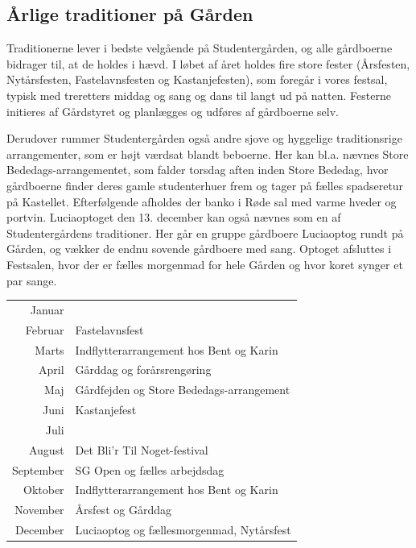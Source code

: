 \documentclass[11pt,article,twoside,openany,danish,extrafontsizes]{memoir} %
\begin{document}
\subsection{Årlige traditioner på Gården}
Traditionerne lever i bedste velgående på Studentergården, og alle gårdboerne bidrager til, at de holdes i hævd. I løbet af året holdes fire store fester (Årsfesten, Nytårsfesten, Fastelavnsfesten og Kastanjefesten), som foregår i vores festsal, typisk med treretters middag og sang og dans til langt ud på natten. Festerne initieres af Gårdstyret og planlægges og udføres af gårdboerne selv.

Derudover rummer Studentergården også andre sjove og hyggelige traditionsrige arrangementer, som er højt værdsat blandt beboerne. Her kan bl.a. nævnes Store Bededags-arrangementet, som falder torsdag aften inden Store Bededag, hvor gårdboerne finder deres gamle studenterhuer frem og tager på fælles spadseretur på Kastellet. Efterfølgende afholdes der banko i Røde sal med varme hveder og portvin. Luciaoptoget den 13. december kan også nævnes som en af Studentergårdens traditioner. Her går en gruppe gårdboere Luciaoptog rundt på Gården, og vækker de endnu sovende gårdboere med sang. Optoget afsluttes i Festsalen, hvor der er fælles morgenmad for hele Gården og hvor koret synger et par sange.

\bigskip

\begin{shaded}
\begin{tabular}{>{\sffamily}r l}
Januar				& \\
Februar				& Fastelavnsfest \\
Marts				& Indflytterarrangement hos Bent og Karin \\
April				& Gårddag og forårsrengøring \\
Maj					& Gårdfejden og Store Bededags-arrangement \\
Juni				& Kastanjefest \\
Juli				& \\
August				& Det Bli’r Til Noget-festival \\
September			& SG Open og fælles arbejdsdag \\
Oktober				& Indflytterarrangement hos Bent og Karin \\
November			& Årsfest og Gårddag \\
December			& Luciaoptog og fællesmorgenmad, Nytårsfest \\
\end{tabular}
\end{shaded}
\end{document}
